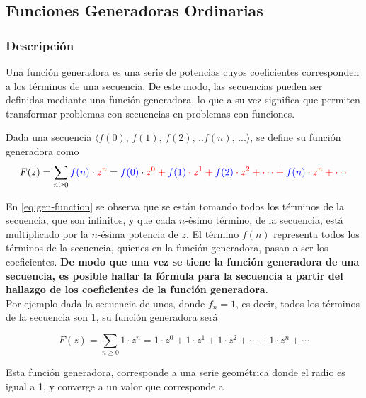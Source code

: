 \subsection*{Funciones Generadoras Ordinarias}


\subsubsection*{Descripción}
Una función generadora es una serie de potencias cuyos coeficientes corresponden a los términos de una secuencia. De este modo, las secuencias pueden ser definidas mediante una función generadora, lo que a su vez significa que permiten transformar problemas con secuencias en problemas con funciones.

Dada una secuencia $\langle f(0),\,f(1),\,f(2),\,..f(n),\,...\rangle$, se define su función generadora como
\begin{equation}
    \label{eq:gen-function}
    F(z) = \sum_{n\ge 0}{{\color{blue}f(n)}\cdot{\color{red}z^n}} 
    = {\color{blue}f(0)}\cdot \color{red}z^0 + {\color{blue}f(1)}\cdot \color{red}z^1 + {\color{blue}f(2)}\cdot \color{red}z^2 + \cdots + {\color{blue}f(n)}\cdot \color{red}z^n + \cdots  
\end{equation}

En \eqref{eq:gen-function} se observa que se están tomando todos los términos de la secuencia, que son infinitos, y que cada $n$-ésimo término, de la secuencia, está multiplicado por la $n$-ésima potencia de $z$. El término $f(n)$ representa todos los términos de la secuencia, quienes en la función generadora, pasan a ser los coeficientes. \textbf{De modo que una vez se tiene la función generadora de una secuencia, es posible hallar la fórmula para la secuencia a partir del hallazgo de los coeficientes de la función generadora}.\\


Por ejemplo dada la secuencia de unos, donde $f_n = 1$, es decir, todos los términos de la secuencia son $1$, su función generadora será

\begin{equation}
    \label{eq:gf-1-seq-basic}
    F(z) = \sum_{n\ge 0}{ 1\cdot z^n} =1\cdot z^0 + 1\cdot z^1 + 1\cdot z^2 + \cdots +  1\cdot z^n + \cdots 
\end{equation}

Esta función generadora, corresponde a una serie geométrica donde el radio es igual a 1, y converge a un valor que corresponde a 

